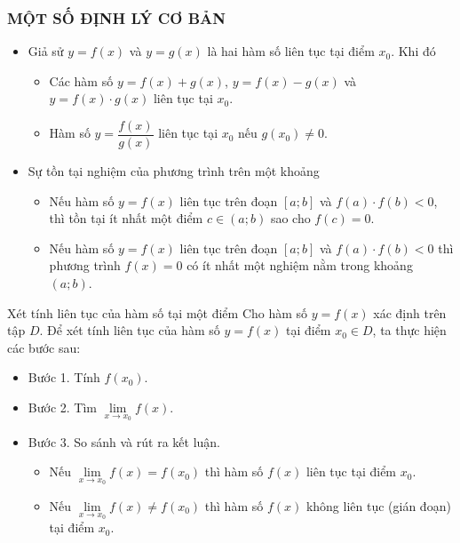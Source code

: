 \subsubsection{MỘT SỐ ĐỊNH LÝ CƠ BẢN}
\begin{itemize}
	\item [\iconMT]  Giả sử $y=f(x)$ và $y=g(x)$ là hai hàm số liên tục tại điểm $x_0$. Khi đó
	\begin{gachsoc}
		\begin{itemize}
			\item Các hàm số $y=f(x)+g(x)$, $y=f(x)-g(x)$ và $y=f(x)\cdot g(x)$ liên tục tại $x_0$.
			\item Hàm số $y=\dfrac{f(x)}{g(x)}$ liên tục tại $x_0$ nếu $g(x_0)\neq 0$.
		\end{itemize}
	\end{gachsoc}
	\item [\iconMT]  Sự tồn tại nghiệm của phương trình trên một khoảng
	\begin{gachsoc}
		\begin{itemize}
			\item Nếu hàm số $y=f(x)$ liên tục trên đoạn $[a;b]$ và $f(a) \cdot f(b)<0$, thì tồn tại ít nhất một điểm $c\in (a;b)$ sao cho $f(c)=0$.
			\item Nếu hàm số $y=f(x)$ liên tục trên đoạn $[a;b]$ và $f(a)\cdot f(b)<0$ thì phương trình $f(x)=0$ có ít nhất một nghiệm nằm trong khoảng $(a;b)$.
		\end{itemize}
	\end{gachsoc}
\end{itemize}

\begin{dang}{Xét tính liên tục của hàm số tại một điểm}
	Cho hàm số $y=f(x)$ xác định trên tập $D$. Để xét tính liên tục của hàm số $y=f(x)$ tại điểm $x_{0}\in D$, ta thực hiện các bước sau:
	\begin{itemize}
		\item [\iconMT] Bước 1. Tính $f(x_0)$.
		\item [\iconMT] Bước 2. Tìm $\lim\limits_{x\to x_0}f(x)$.
		\item [\iconMT] Bước 3. So sánh và rút ra kết luận.
		\begin{itemize}
			\item Nếu $\lim\limits_{x\to x_0}f(x)=f(x_0)$ thì hàm số $f(x)$ liên tục tại điểm $x_0$.
			\item Nếu $\lim\limits_{x\to x_0}f(x)\ne f(x_0)$ thì hàm số $f(x)$ không liên tục (gián đoạn) tại điểm $x_0$.
		\end{itemize}
	\end{itemize}
\end{dang}

